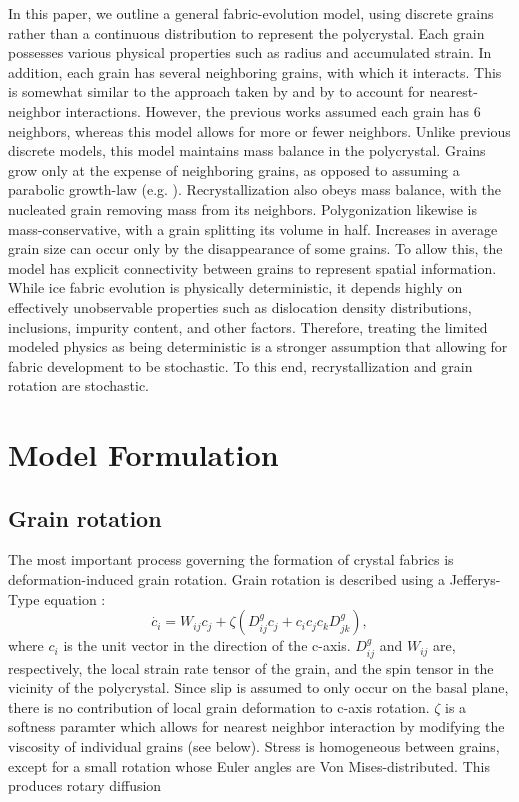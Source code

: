 \documentclass{igs}
\begin{document}
In this paper, we outline a general fabric-evolution model, using discrete grains rather than a continuous distribution to represent the polycrystal. Each grain possesses various physical properties such as radius and accumulated strain. In addition, each grain has several neighboring grains, with which it interacts. This is somewhat similar to the approach taken by \citet{thorsteinsson2002nni} and by \citet{kennedy} to account for nearest-neighbor interactions. However, the previous works assumed each grain has 6 neighbors, whereas this model allows for more or fewer neighbors. Unlike previous discrete models, this model maintains mass balance in the polycrystal. Grains grow only at the expense of neighboring grains, as opposed to assuming a parabolic growth-law (e.g. \citet{gow1969}). Recrystallization also obeys mass balance, with the nucleated grain removing mass from its neighbors. Polygonization likewise is mass-conservative, with a grain splitting its volume in half. Increases in average grain size can occur only by the disappearance of some grains. To allow this, the model has explicit connectivity between grains to represent spatial information. While ice fabric evolution is physically deterministic, it depends highly on effectively unobservable properties such as dislocation density distributions, inclusions, impurity content, and other factors. Therefore, treating the limited modeled physics as being deterministic is a stronger assumption that allowing for fabric development to be stochastic. To this end, recrystallization and grain rotation are stochastic.

\section{Model Formulation}
\subsection{Grain rotation}
The most important process governing the formation of crystal fabrics is deformation-induced grain rotation. Grain rotation is described using a Jefferys-Type equation \citep{azuma94}:
\begin{equation}
   \dot{c_i} =  W_{ij}  c_j + \zeta \left( D^g_{ij} c_j + c_i c_j c_k D^g_{jk} \right),
\end{equation}
where $c_i$ is the unit vector in the direction of the c-axis. $D^g_{ij}$ and $W_{ij}$ are, respectively, the local strain rate tensor of the grain, and the spin tensor in the vicinity of the polycrystal. Since slip is assumed to only occur on the basal plane, there is no contribution of local grain deformation to c-axis rotation. $\zeta$ is a softness paramter which allows for nearest neighbor interaction by modifying the viscosity of individual grains (see below). Stress is homogeneous between grains, except for a small rotation whose Euler angles are Von Mises-distributed. This produces rotary diffusion 
\end{document}
